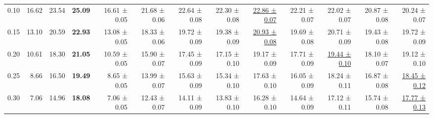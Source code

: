 \documentclass[a4paper,10pt,conference,onecolumn]{IEEEtran}
\begin{document}
\begin{table*}[b]
{\begin{tabular}{@{}crrrrrrrrrrrr@{}}
			0.10        & 16.62                                      & 23.54                                                                    & \textbf{25.09}                        & 16.61 ± 0.05                  & 21.68 ± 0.06                          & 22.64 ± 0.08                          & 22.30 ± 0.08                          & \underline{22.86 ± 0.07}              & 22.21 ± 0.07                          & 22.02 ± 0.07                          & 20.87 ± 0.08                          & 20.24 ± 0.07                          \\
			0.15        & 13.10                                      & 20.59                                                                    & \textbf{22.93}                        & 13.08 ± 0.05                  & 18.33 ± 0.06                          & 19.72 ± 0.09                          & 19.38 ± 0.09                          & \underline{20.93 ± 0.08}              & 19.69 ± 0.08                          & 20.71 ± 0.09                          & 19.43 ± 0.08                          & 19.72 ± 0.09                          \\
			0.20        & 10.61                                      & 18.30                                                                    & \textbf{21.05}                        & 10.59 ± 0.05                  & 15.90 ± 0.07                          & 17.45 ± 0.09                          & 17.15 ± 0.10                          & 19.17 ± 0.09                          & 17.71 ± 0.09                          & \underline{19.44 ± 0.10}              & 18.10 ± 0.07                          & 19.12 ± 0.10                          \\
			0.25        & 8.66                                       & 16.50                                                                    & \textbf{19.49}                        & 8.65 ± 0.05                   & 13.99 ± 0.07                          & 15.63 ± 0.09                          & 15.34 ± 0.10                          & 17.63 ± 0.10                          & 16.05 ± 0.09                          & 18.24 ± 0.11                          & 16.87 ± 0.08                          & \underline{18.45 ± 0.12}              \\
			0.30        & 7.06                                       & 14.96                                                                    & \textbf{18.08}                        & 7.06 ± 0.05                   & 12.43 ± 0.07                          & 14.11 ± 0.09                          & 13.83 ± 0.10                          & 16.28 ± 0.10                          & 14.64 ± 0.09                          & 17.12 ± 0.11                          & 15.74 ± 0.08                          & \underline{17.77 ± 0.13}              \\

\end{tabular}}
\end{table*}
\end{document}

